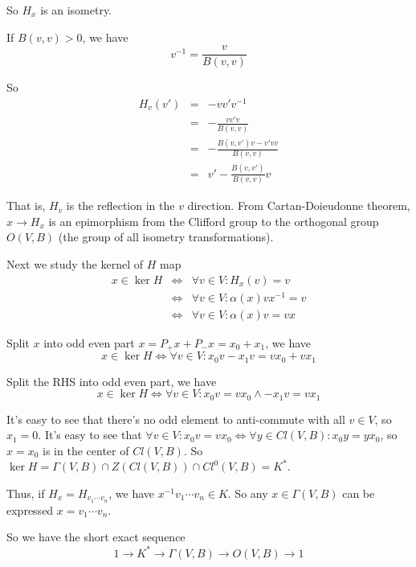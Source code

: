 \documentclass[12pt]{book}
\begin{document}
	So $H_x$ is an isometry.
	
	If $B(v,v)>0$, we have
	\begin{equation}
		v^{-1}=\frac v{B(v,v)}
	\end{equation}
	
	So
	\begin{eqnarray}
		H_v(v')&=&-vv'v^{-1}\\
		&=&-\frac {vv'v}{B(v,v)}\\
		&=&-\frac {B(v,v')v-v'vv}{B(v,v)}\\
		&=&v'-\frac {B(v,v')}{B(v,v)}v
	\end{eqnarray}
	
	That is, $H_v$ is the reflection in the $v$ direction. From Cartan-Doieudonne theorem, $x\rightarrow H_x$ is an epimorphism from the Clifford group to the orthogonal group $O(V,B)$ (the group of all isometry transformations).
	
	Next we study the kernel of $H$ map
	\begin{eqnarray}
		x\in\ker H&\iff&\forall v\in V:H_x(v)=v\\
		&\iff&\forall v\in V:\alpha(x)vx^{-1}=v\\
		&\iff&\forall v\in V:\alpha(x)v=vx
	\end{eqnarray}
	
	Split $x$ into odd even part $x=P_+x+P_-x=x_0+x_1$, we have
	\begin{equation}
		x\in\ker H\iff \forall v\in V:x_0v-x_1v=vx_0+vx_1
	\end{equation}
	
	Split the RHS into odd even part, we have
	\begin{equation}
		x\in\ker H\iff \forall v\in V:x_0v=vx_0\wedge -x_1v=vx_1
	\end{equation}
	
	It's easy to see that there's no odd element to anti-commute with all $v\in V$, so $x_1=0$. It's easy to see that $\forall v\in V:x_0v=vx_0\iff \forall y\in Cl(V,B):x_0y=yx_0$, so $x=x_0$ is in the center of $Cl(V,B)$. So $\ker H=\Gamma(V,B)\cap Z(Cl(V,B))\cap Cl^0(V,B)=K^*$.
	
	Thus, if $H_x =H_{v_1\cdots v_n}$, we have $x^{-1}v_1\cdots v_n\in K$. So any $x\in \Gamma(V,B)$ can be expressed $x=v_1\cdots v_n$.
	
	So we have the short exact sequence
	\begin{equation}
		1\rightarrow K^*\rightarrow \Gamma(V,B)\rightarrow O(V,B)\rightarrow 1
	\end{equation}
	
\end{document}
